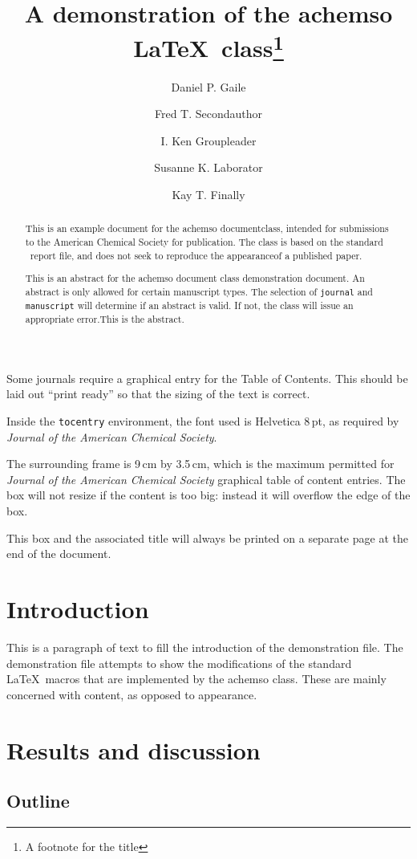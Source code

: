 \documentclass[journal=jacsat,manuscript=article]{achemso}
\author{Daniel P. Gaile}
\author{Fred T. Secondauthor}
\author{I. Ken Groupleader}
\affiliation{Department of Chemistry, Unknown University, Unknown Town}
\author{Susanne K. Laborator}
\affiliation{Lead Discovery, BigPharma, Big Town, USA}
\author{Kay T. Finally}
\affiliation{Department of Chemistry, Unknown University, Unknown Town}
\title[An \textsf{achemso} demo]{A demonstration of the \textsf{achemso}
\LaTeX~class\footnote{A footnote for the title}}
\begin{document}
\begin{abstract}
This is an example document for the \textsf{achemso} documentclass,
intended for submissions to the American Chemical Society for
publication. The class is based on the standard \LaTeXe~\textsf{report}
file, and does not seek to reproduce the appearanceof a published paper.

This is an abstract for the \textsf{achemso} document class
demonstration document. An abstract is only allowed for certain
manuscript types. The selection of \texttt{journal} and
\texttt{manuscript} will determine if an abstract is valid. If not, the
class will issue an appropriate error.This is the abstract.
\end{abstract}
\begin{tocentry}
Some journals require a graphical entry for the Table of Contents.
This should be laid out ``print ready'' so that the sizing of the
text is correct.

Inside the \texttt{tocentry} environment, the font used is Helvetica
8\,pt, as required by \emph{Journal of the American Chemical
Society}.

The surrounding frame is 9\,cm by 3.5\,cm, which is the maximum
permitted for  \emph{Journal of the American Chemical Society}
graphical table of content entries. The box will not resize if the
content is too big: instead it will overflow the edge of the box.

This box and the associated title will always be printed on a
separate page at the end of the document.
\end{tocentry}

\section{Introduction}\label{introduction}

This is a paragraph of text to fill the introduction of the
demonstration file. The demonstration file attempts to show the
modifications of the standard \LaTeX~macros that are implemented by the
\textsf{achemso} class. These are mainly concerned with content, as
opposed to appearance.

\section{Results and discussion}\label{results-and-discussion}

\subsection{Outline}\label{outline}
\end{document}
